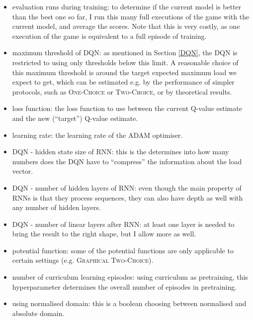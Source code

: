 \begin{itemize}
    \item evaluation runs during training: to determine if the current model is better than the best one so far, I run this many full executions of the game with the current model, and average the scores. Note that this is very costly, as one execution of the game is equivalent to a full episode of training.
    
    \item maximum threshold of DQN: as mentioned in Section \ref{DQN}, the DQN is restricted to using only thresholds below this limit. A reasonable choice of this maximum threshold is around the target expected maximum load we expect to get, which can be estimated e.g. by the performance of simpler protocols, such as \textsc{One-Choice} or \textsc{Two-Choice}, or by theoretical results.
    
    \item loss function: the loss function to use between the current Q-value estimate and the new (``target'') Q-value estimate. 
    
    \item learning rate: the learning rate of the ADAM optimiser. 
    
    \item DQN - hidden state size of RNN: this is the determines into how many numbers does the DQN have to ``compress'' the information about the load vector.
    
    \item DQN - number of hidden layers of RNN: even though the main property of RNNs is that they process sequences, they can also have depth as well with any number of hidden layers.
    
    \item DQN - number of linear layers after RNN: at least one layer is needed to bring the result to the right shape, but I allow more as well.
    
    \item potential function: some of the potential functions are only applicable to certain settings (e.g. \textsc{Graphical Two-Choice}).
    
    \item number of curriculum learning episodes: using curriculum as pretraining, this hyperparameter determines the overall number of episodes in pretraining.
    
    \item using normalised domain: this is a boolean choosing between normalised and absolute domain.
    
    


\end{itemize}


